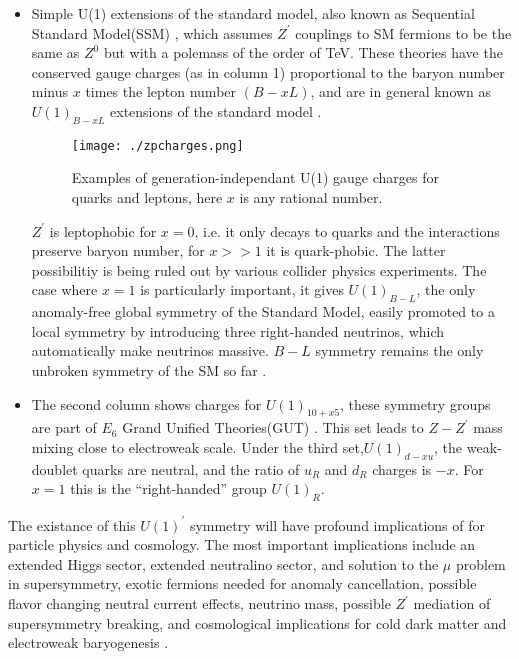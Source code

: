 \documentclass[12pt,a4paper]{article}		%
\begin{document}
    
 \begin{itemize}
 	\item Simple U(1) extensions of the standard model, also known as Sequential Standard Model(SSM) \cite{zpheno1}, which assumes $Z^\prime$ couplings to SM fermions to be the same as $Z^0$ but with a polemass of the order of TeV. These theories have the conserved gauge charges (as in column 1) proportional to the baryon number minus $x$ times the lepton number $(B - x L)$, and are in general known as $U(1)_{B-xL}$ extensions of the standard model \cite{zpdg}.
 	
 	\begin{figure}[h]
 		\begin{centering}	
 			\texttt{[image: ./zpcharges.png]} 
 			\caption{ Examples of generation-independant U(1) gauge charges for quarks and leptons, here $x$ is any rational number.}
 			\label{U1charges}
 			\centering
 		\end{centering} 		
 	\end{figure}   
 	   
 	$Z^\prime$ is leptophobic for $x=0$, i.e. it only decays to quarks and the interactions preserve baryon number, for $x>>1$ it is quark-phobic. The latter possibilitiy is being ruled out by various collider physics experiments. The case where $x=1$ is particularly important, it gives $U(1)_{B-L}$,  the only anomaly-free global symmetry of the Standard Model, easily promoted to a local symmetry by introducing three right-handed neutrinos, which automatically make neutrinos massive. $B-L$ symmetry remains the only unbroken symmetry of the SM so far \cite{bl}.   	  
 	   
	\item The second column shows charges for $U(1)_{10+x5}$, these symmetry groups are part of $E_6$ Grand Unified Theories(GUT) \cite{zpheno4}. This set leads to $	Z - Z^\prime$ mass mixing close to electroweak scale. Under the third set,$U(1)_{d−xu}$, the weak-doublet quarks are neutral, and the ratio of $u_R$ and $d_R$ charges is $−x$.  For $x= 1$ this is the “right-handed” group $U(1)_R$. 	
 \end{itemize} 
   
   The existance of this $U(1)^\prime$ symmetry will have profound implications of for particle physics and cosmology. The most important implications include an extended Higgs sector, extended neutralino sector, and solution to the $\mu$ problem in supersymmetry, exotic fermions needed for anomaly cancellation, possible flavor changing neutral current effects, neutrino mass, possible $Z^\prime$ mediation of supersymmetry breaking, and cosmological implications for cold dark matter and electroweak baryogenesis \cite{paul}.     
   
\end{document}
